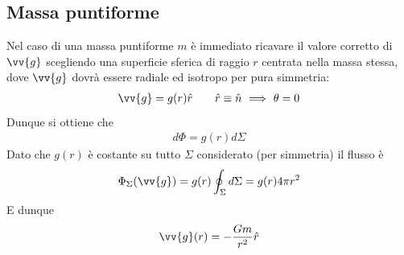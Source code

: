 \documentclass[a4paper, oneside]{book}
\begin{document}
\subsection{Massa puntiforme}
\begin{figure}
    \centering
\end{figure}
Nel caso di una massa puntiforme $m$ è immediato ricavare il valore 
corretto di $\vv{g}$ scegliendo una superficie sferica di raggio $r$ centrata nella massa
stessa, dove $\vv{g}$ dovrà essere radiale ed isotropo per pura simmetria:
\begin{align*}
    \vv{g} = g(r) \hat{r} \qquad \hat{r} \equiv \hat{n} \ \Longrightarrow \ \theta = 0   
\end{align*} 
Dunque si ottiene che
\begin{gather*}
    d\Phi = g(r) d\Sigma
\end{gather*} 
Dato che $g(r) $ è costante su tutto $\Sigma$ considerato (per simmetria) il flusso è
\begin{gather*}
    \Phi_\Sigma(\vv{g} ) = g(r) \oint_{\Sigma}d\Sigma = g(r) 4\pi r^{2}
\end{gather*}
E dunque
\begin{align}
    \vv{g}(r) = - \frac{Gm}{r^{2}} \hat{r}  
\end{align}
\end{document}
